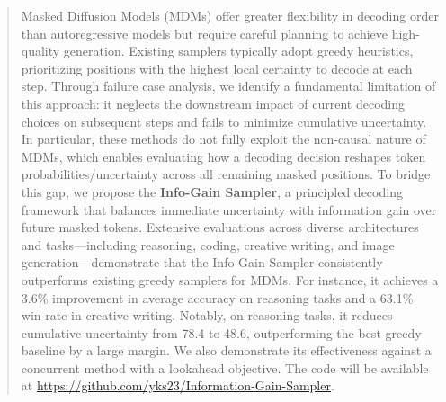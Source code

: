 \begin{abstract}
Masked Diffusion Models (MDMs) offer greater flexibility in decoding order than autoregressive models but require careful planning to achieve high-quality generation. Existing samplers typically adopt greedy heuristics, prioritizing positions with the highest local certainty to decode at each step. Through failure case analysis, we identify a fundamental limitation of this approach: it neglects the downstream impact of current decoding choices on subsequent steps and fails to minimize cumulative uncertainty. In particular, these methods do not fully exploit the non-causal nature of MDMs, which enables evaluating how a decoding decision reshapes token probabilities/uncertainty across all remaining masked positions. To bridge this gap, we propose the \textbf{Info-Gain Sampler}, a principled decoding framework that balances immediate uncertainty with information gain over future masked tokens. 
Extensive evaluations across diverse architectures and tasks—including reasoning, coding, creative writing, and image generation—demonstrate that the Info-Gain Sampler consistently outperforms existing greedy samplers for MDMs. For instance, it achieves a 3.6\% improvement in average accuracy on reasoning tasks and a 63.1\% win-rate in creative writing. Notably, on reasoning tasks, it reduces cumulative uncertainty from 78.4 to 48.6, outperforming the best greedy baseline by a large margin. We also demonstrate its effectiveness against a concurrent method with a lookahead objective. The code will be available at \url{https://github.com/yks23/Information-Gain-Sampler}.
\end{abstract}